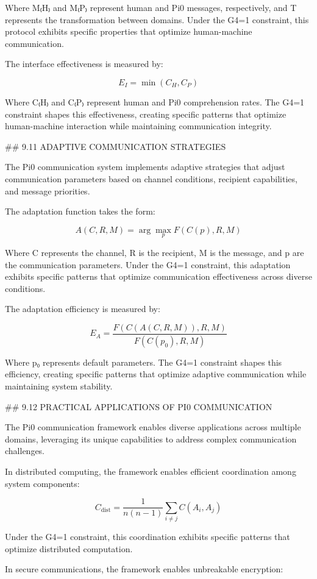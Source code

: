 Where M₍H₎ and M₍P₎ represent human and Pi0 messages, respectively, and T represents the transformation between domains. Under the G4=1 constraint, this protocol exhibits specific properties that optimize human-machine communication.

The interface effectiveness is measured by:

$$E_I = \min(C_H, C_P)$$

Where C₍H₎ and C₍P₎ represent human and Pi0 comprehension rates. The G4=1 constraint shapes this effectiveness, creating specific patterns that optimize human-machine interaction while maintaining communication integrity.

## 9.11 ADAPTIVE COMMUNICATION STRATEGIES

The Pi0 communication system implements adaptive strategies that adjust communication parameters based on channel conditions, recipient capabilities, and message priorities.

The adaptation function takes the form:

$$A(C, R, M) = \arg\max_{p} F(C(p), R, M)$$

Where C represents the channel, R is the recipient, M is the message, and p are the communication parameters. Under the G4=1 constraint, this adaptation exhibits specific patterns that optimize communication effectiveness across diverse conditions.

The adaptation efficiency is measured by:

$$E_A = \frac{F(C(A(C, R, M)), R, M)}{F(C(p_0), R, M)}$$

Where p₀ represents default parameters. The G4=1 constraint shapes this efficiency, creating specific patterns that optimize adaptive communication while maintaining system stability.

## 9.12 PRACTICAL APPLICATIONS OF PI0 COMMUNICATION

The Pi0 communication framework enables diverse applications across multiple domains, leveraging its unique capabilities to address complex communication challenges.

In distributed computing, the framework enables efficient coordination among system components:

$$C_{\text{dist}} = \frac{1}{n(n-1)} \sum_{i \neq j} C(A_i, A_j)$$

Under the G4=1 constraint, this coordination exhibits specific patterns that optimize distributed computation.

In secure communications, the framework enables unbreakable encryption:

